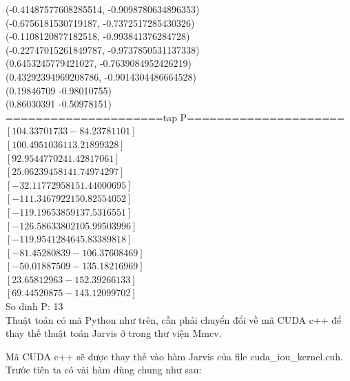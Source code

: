 \documentclass[12pt,a4paper,openany,oneside]{report}
\begin{document}
(-0.41487577608285514, -0.9098780634896353)\\
(-0.6756181530719187, -0.7372517285430326)\\
(-0.1108120877182518, -0.993841376284728)\\
(-0.22747015261849787, -0.9737850531137338)\\
(0.6453245779421027, -0.7639084952426219)\\
(0.43292394969208786, -0.9014304486664528)\\
(0.19846709 -0.98010755)\\
(0.86030391 -0.50978151)\\
=====================tap P=====================\\
$\left[104.33701733 -84.23781101\right]$\\
$\left[100.49510361  13.21899328\right]$\\
$\left[92.95447702 41.42817061\right]$\\
$\left[ 25.06239458 141.74974297\right]$\\
$\left[-32.11772958 151.44000695\right]$\\
$\left[-111.3467922   150.82554052\right]$\\
$\left[-119.19653859  137.5316551 \right]$\\
$\left[-126.58633802  105.99503996\right]$\\
$\left[-119.95412846   45.83389818\right]$\\
$\left[ -81.45280839 -106.37608469\right]$\\
$\left[ -50.01887509 -135.18216969\right]$\\
$\left[  23.65812963 -152.39266133\right]$\\
$\left[  69.44520875 -143.12099702\right]$\\
So dinh P:  13\\


Thuật toán có mã Python như trên, cần phải chuyển đổi về mã CUDA c++ để thay thế thuật toán Jarvis ở trong thư viện Mmcv. 

Mã CUDA c++ sẽ được thay thế vào hàm Jarvis của file cuda\_iou\_kernel.cuh. Trước tiên ta có vài hàm dùng chung như sau:
\end{document}
